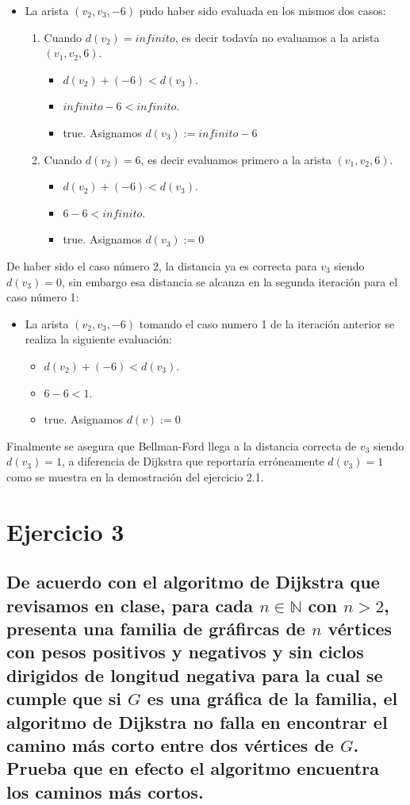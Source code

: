 \documentclass[12pt]{article}
\begin{document}
\begin{itemize}
\begin{enumerate}
	\end{enumerate}
		\item La arista $(v_2, v_3, -6)$ pudo haber sido evaluada en los mismos dos casos:
		\begin{enumerate}
			 \item Cuando $d(v_2)=infinito$, es decir todavía no evaluamos a la arista $(v_1, v_2, 6)$.
			 \begin{itemize}
			 	\item $d(v_2) + (-6) < d(v_3)$.
			 	\item $infinito - 6 < infinito$.
			 	\item true. Asignamos $d(v_3) := infinito - 6$
			 \end{itemize}
			 \item Cuando $d(v_2)=6$, es decir evaluamos primero a la arista $(v_1, v_2, 6)$.
			 \begin{itemize}
			 	\item $d(v_2) + (-6) < d(v_3)$.
			 	\item $6 - 6 < infinito$.
			 	\item true. Asignamos $d(v_3) := 0$
			 \end{itemize}
		\end{enumerate}
	\end{itemize}
	De haber sido el caso número 2, la distancia ya es correcta para $v_3$ siendo $d(v_3)=0$, sin embargo esa distancia se alcanza en la segunda iteración para el caso número 1:
	\begin{itemize}
	\item La arista $(v_2, v_3, -6)$ tomando el caso numero 1 de la iteración anterior se realiza la siguiente evaluación:
			\begin{itemize}
				\item $d(v_2) + (-6) < d(v_3)$.
				\item $6 - 6 < 1$.
				\item true. Asignamos $d(v) := 0$
			\end{itemize}
	\end{itemize}
Finalmente se asegura que Bellman-Ford llega a la distancia correcta de $v_3$ siendo $d(v_3)=1$, a diferencia de Dijkstra que reportaría erróneamente $d(v_3)=1$ como se muestra en la demostración del ejercicio 2.1.
\section{Ejercicio 3}
\subsection{De acuerdo con el algoritmo de Dijkstra que revisamos en clase, para cada $n\in \mathbb{N}$ con $n>2$, presenta una familia de gráfircas de $n$ vértices con pesos positivos y negativos y sin ciclos dirigidos de longitud negativa para la cual se cumple que si $G$ es una gráfica de la familia, el algoritmo de Dijkstra no falla en encontrar el camino más corto entre dos vértices de $G$. Prueba que en efecto el algoritmo encuentra los caminos más cortos.}
\end{document}
